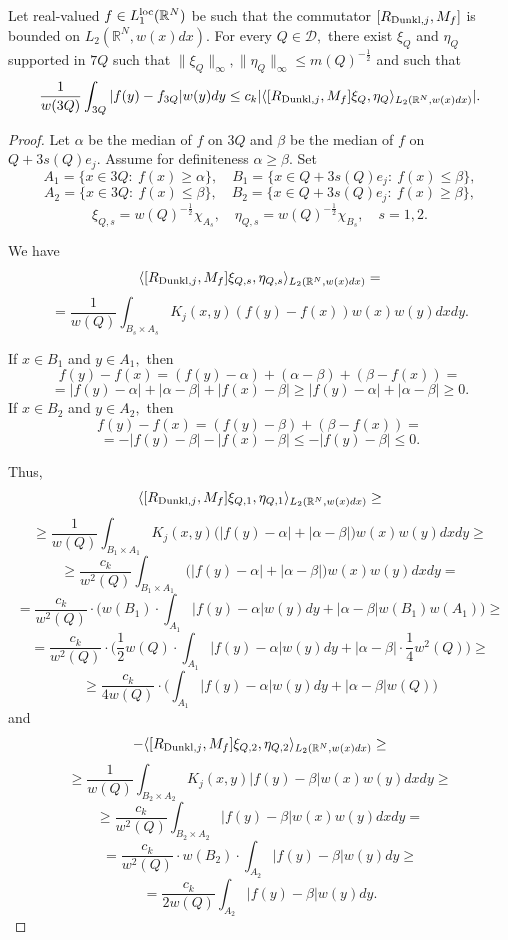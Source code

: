 \documentclass{amsart}
\numberwithin{equation}{section}
\begin{document}
\begin{lemma}\label{improved zhijie lemma} Let real-valued $f\in L_1^{{\rm loc}}(\mathbb{R}^N)$ be such that the commutator $[R_{{\rm Dunkl},j},M_f]$ is bounded on $L_2(\mathbb{R}^N,w(x)dx).$ For every $Q\in\mathcal{D},$ there exist $\xi_Q$ and $\eta_Q$ supported in $7Q$ such that $\|\xi_Q\|_{\infty},\|\eta_Q\|_{\infty}\leq m(Q)^{-\frac12}$ and such that
$$\frac1{w(3Q)}\int_{3Q}|f(y)-f_{3Q}|w(y)dy\leq c_k|\langle[R_{{\rm Dunkl},j},M_f]\xi_Q,\eta_Q\rangle_{L_2(\mathbb{R}^N,w(x)dx)}|.$$
\end{lemma}
\begin{proof} Let $\alpha$ be the median of $f$ on $3Q$ and $\beta$ be the median of $f$ on $Q+3s(Q)e_j.$ Assume for definiteness $\alpha\geq\beta.$ Set
$$A_1=\{x\in 3Q:\ f(x)\geq\alpha\},\quad B_1=\{x\in Q+3s(Q)e_j:\ f(x)\leq\beta\},$$
$$A_2=\{x\in 3Q:\ f(x)\leq\beta\},\quad B_2=\{x\in Q+3s(Q)e_j:\ f(x)\geq\beta\},$$
$$\xi_{Q,s}=w(Q)^{-\frac12}\chi_{A_s},\quad \eta_{Q,s}=w(Q)^{-\frac12}\chi_{B_s},\quad s=1,2.$$

We have
$$\langle[R_{{\rm Dunkl},j},M_f]\xi_{Q,s},\eta_{Q,s}\rangle_{L_2(\mathbb{R}^N,w(x)dx)}=$$
$$=\frac1{w(Q)}\int_{B_s\times A_s}K_j(x,y)(f(y)-f(x))w(x)w(y)dxdy.$$

If $x\in B_1$ and $y\in A_1,$ then
$$f(y)-f(x)=(f(y)-\alpha)+(\alpha-\beta)+(\beta-f(x))=$$
$$=|f(y)-\alpha|+|\alpha-\beta|+|f(x)-\beta|\geq |f(y)-\alpha|+|\alpha-\beta|\geq0.$$
If $x\in B_2$ and $y\in A_2,$ then
$$f(y)-f(x)=(f(y)-\beta)+(\beta-f(x))=$$
$$=-|f(y)-\beta|-|f(x)-\beta|\leq -|f(y)-\beta|\leq 0.$$

Thus,
$$\langle[R_{{\rm Dunkl},j},M_f]\xi_{Q,1},\eta_{Q,1}\rangle_{L_2(\mathbb{R}^N,w(x)dx)}\geq $$
$$\geq \frac1{w(Q)}\int_{B_1\times A_1}K_j(x,y)\big(|f(y)-\alpha|+|\alpha-\beta|\big)w(x)w(y)dxdy\geq $$
$$\geq\frac{c_k}{w^2(Q)}\int_{B_1\times A_1}\big(|f(y)-\alpha|+|\alpha-\beta|\big)w(x)w(y)dxdy=$$
$$=\frac{c_k}{w^2(Q)}\cdot\Big(w(B_1)\cdot\int_{A_1}|f(y)-\alpha|w(y)dy+|\alpha-\beta|w(B_1)w(A_1)\Big)\geq $$
$$=\frac{c_k}{w^2(Q)}\cdot\Big(\frac12w(Q)\cdot\int_{A_1}|f(y)-\alpha|w(y)dy+|\alpha-\beta|\cdot \frac14w^2(Q)\Big)\geq $$
$$\geq\frac{c_k}{4w(Q)}\cdot\Big(\int_{A_1}|f(y)-\alpha|w(y)dy+|\alpha-\beta|w(Q)\Big)$$
and
$$-\langle[R_{{\rm Dunkl},j},M_f]\xi_{Q,2},\eta_{Q,2}\rangle_{L_2(\mathbb{R}^N,w(x)dx)}\geq $$
$$\geq \frac1{w(Q)}\int_{B_2\times A_2}K_j(x,y)|f(y)-\beta|w(x)w(y)dxdy\geq $$
$$\geq\frac{c_k}{w^2(Q)}\int_{B_2\times A_2}|f(y)-\beta|w(x)w(y)dxdy=$$
$$=\frac{c_k}{w^2(Q)}\cdot w(B_2)\cdot\int_{A_2}|f(y)-\beta|w(y)dy\geq $$
$$=\frac{c_k}{2w(Q)}\int_{A_2}|f(y)-\beta|w(y)dy.$$


\end{proof}
\end{document}
